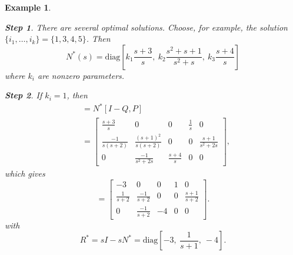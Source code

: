 \documentclass[twocolumn,12pt]{autart}
\theoremstyle{plain}
\newtheorem{example}{Example}
\newtheorem{Steps}{Step}
\begin{document}
\begin{example}
\begin{Steps}
There are several optimal solutions. Choose, for example, the solution $\{i_1,\ldots,i_k\}=\{1,3,4,5\}$. Then 
$$N^*(s)=\text{diag} \left[k_1\frac{s+3}{s}, ~ k_2\frac{s^2+s+1}{s^2+s},~   k_3\frac{s+4}{s} \right]$$ 
where $k_i$ are nonzero parameters.
\end{Steps}
\begin{Steps}
If $k_i=1$, then 
\begin{align*}
[I-W/s,~ V/s]&=N^*[I-Q,P]\\
&=\begin{bmatrix}
\frac{s+3}{s} & 0 & 0 & \frac{1}{s} & 0 \\
\frac{-1}{s(s+2)} & \frac{(s+1)^2}{s(s+2)} & 0 & 0 & \frac{s+1}{s^2+2s}\\
0 & \frac{-1}{s^2+2s} & \frac{s+4}{s} & 0 & 0 
\end{bmatrix},
\end{align*}
which gives
\begin{equation*}
[W,~ V]=\begin{bmatrix}
-3 & 0 & 0 & 1 & 0 \\
\frac{1}{s+2} & \frac{-1}{s+2} & 0 & 0 & \frac{s+1}{s+2}\\
0 & \frac{-1}{s+2} & -4 & 0 & 0 
\end{bmatrix}.
\end{equation*} 
with
$$R^*=sI-sN^*=\text{diag}\left[-3,~ \frac{1}{s+1}, ~ -4\right] 
.$$
\end{Steps}


\end{example}
\end{document}
